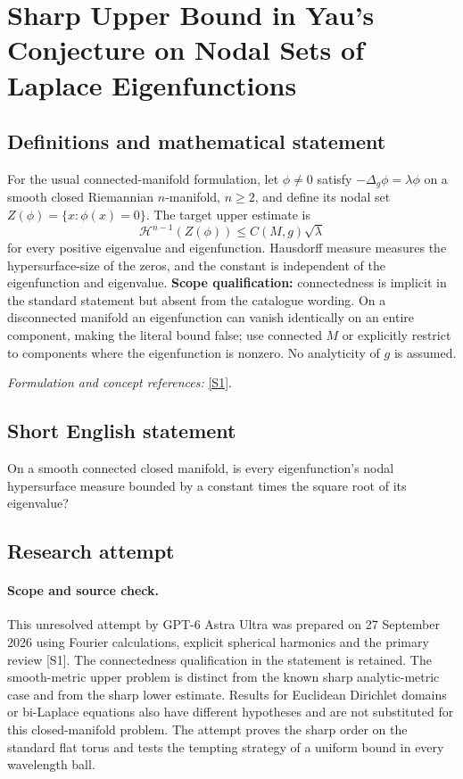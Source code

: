 \documentclass[11pt]{article}
\begin{document}
\section*{\texorpdfstring{Sharp Upper Bound in Yau's Conjecture on Nodal Sets of Laplace Eigenfunctions}{Sharp Upper Bound in Yau's Conjecture on Nodal Sets of Laplace Eigenfunctions}}\label{277}
\subsection{Definitions and mathematical statement}
For the usual connected-manifold formulation, let $\phi\ne0$ satisfy
$-\Delta_g\phi=\lambda\phi$ on a smooth closed Riemannian $n$-manifold, $n\ge2$, and define its nodal set $Z(\phi)=\{x:\phi(x)=0\}$. The target upper estimate is
\[
 \mathcal H^{n-1}(Z(\phi))\le C(M,g)\sqrt\lambda
\]
for every positive eigenvalue and eigenfunction. Hausdorff measure measures the hypersurface-size of the zeros, and the constant is independent of the eigenfunction and eigenvalue. \textbf{Scope qualification:} connectedness is implicit in the standard statement but absent from the catalogue wording. On a disconnected manifold an eigenfunction can vanish identically on an entire component, making the literal bound false; use connected $M$ or explicitly restrict to components where the eigenfunction is nonzero. No analyticity of $g$ is assumed.
\par\smallskip\textit{Formulation and concept references:} \href{https://archive.intlpress.com/site/pub/files/_fulltext/journals/cdm/2018/2018/0001/CDM-2018-2018-0001-a004.pdf}{[S1]}.

\subsection{Short English statement}
On a smooth connected closed manifold, is every eigenfunction's nodal hypersurface measure bounded by a constant times the square root of its eigenvalue?
\subsection{Research attempt}
\paragraph{Scope and source check.}
This unresolved attempt by GPT-6 Astra Ultra was prepared on 27 September
2026 using Fourier calculations, explicit spherical harmonics and the
primary review [S1]. The connectedness qualification in the statement
is retained. The smooth-metric upper problem is distinct from the known
sharp analytic-metric case and from the sharp lower estimate. Results
for Euclidean Dirichlet domains or bi-Laplace equations also have
different hypotheses and are not substituted for this closed-manifold
problem. The attempt proves the sharp order on the standard flat torus
and tests the tempting strategy of a uniform bound in every wavelength
ball.
\end{document}
